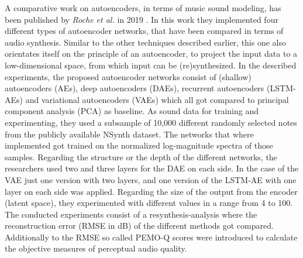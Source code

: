 A comparative work on autoencoders, in terms of music sound modeling, has been published by \textit{Roche et al.} in 2019 \cite{roche2019autoencoders}. In this work they implemented four different types of autoencoder networks, that have been compared in terms of audio synthesis. Similar to the other techniques described earlier, this one also orientates itself on the principle of an autoencoder, to project the input data to a low-dimensional space, from which input can be (re)synthesized. In the described experiments, the proposed autoencoder networks consist of (shallow) autoencoders (AEs), deep autoencoders (DAEs), recurrent autoencoders (LSTM-AEs) and variational autoencoders (VAEs) which all got compared to principal component analysis (PCA) as baseline. As sound data for training and experimenting, they used a subsample of 10,000 different randomly selected notes from the publicly available NSynth dataset. The networks that where implemented got trained on the normalized log-magnitude spectra of those samples. Regarding the structure or the depth of the different networks, the researchers used two and three layers for the DAE on each side. In the case of the VAE just one version with two layers, and one version of the LSTM-AE with one layer on each side was applied. Regarding the size of the output from the encoder (latent space), they experimented with different values in a range from 4 to 100. The conducted experiments consist of a resynthesis-analysis where the reconstruction error (RMSE in dB) of the different methods got compared. Additionally to the RMSE so called PEMO-Q scores were introduced to calculate the objective measures of perceptual audio quality.\\
